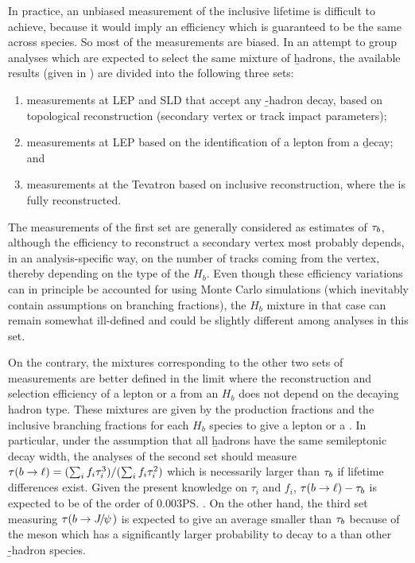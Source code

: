 In practice, an unbiased measurement of the inclusive lifetime is
difficult to achieve, because it would imply an efficiency which is
guaranteed to be the same across species.  So most of the measurements
are biased.  In an attempt to group analyses which are expected to
select the same mixture of \b hadrons, the available results (given in
) are divided into the following three sets:
\begin{enumerate}
\item measurements at LEP and SLD that accept any \b-hadron decay, based 
      on topological reconstruction (secondary vertex or track impact
      parameters);
\item measurements at LEP based on the identification
      of a lepton from a \b decay; and
\item measurements at the Tevatron based on inclusive 
       reconstruction, where the
      \particle{\jpsi} is fully reconstructed.
\end{enumerate}

The measurements of the first set are generally considered as estimates
of $\tau_{b}$, although the efficiency to reconstruct a secondary
vertex most probably depends, in an analysis-specific way, on the number
of tracks coming from the vertex, thereby depending on the type of the
$H_b$.  Even though these efficiency variations can in principle be
accounted for using Monte Carlo simulations (which inevitably contain
assumptions on branching fractions), the $H_b$ mixture in that case can
remain somewhat ill-defined and could be slightly different among
analyses in this set.

On the contrary, the mixtures corresponding to the other two sets of
measurements are better defined in the limit where the reconstruction
and selection efficiency of a lepton or a \particle{\jpsi} from an
$H_b$ does not depend on the decaying hadron type.  These mixtures are
given by the production fractions and the inclusive branching fractions
for each $H_b$ species to give a lepton or a \particle{\jpsi}.  In
particular, under the assumption that all \b hadrons have the same
semileptonic decay width, the analyses of the second set should measure
$\tau(b\to\ell) = (\sum_i f_i \tau_i^3) /(\sum_i f_i \tau_i^2)$ which is
necessarily larger than $\tau_{b}$ if lifetime differences exist.
Given the present knowledge on $\tau_i$ and $f_i$,
$\tau(b\to\ell)-\tau_{b}$ is expected to be of the order of 0.003\ps.
On the other hand, the third set measuring $\tau(b\to{J\mskip -3mu/\mskip -2mu\psi\mskip 2mu})$
is expected to give an average smaller than $\tau_{b}$ because 
of the \Bc meson which has a significantly
larger probability to decay to a \particle{\jpsi}
than other \b-hadron species. 

